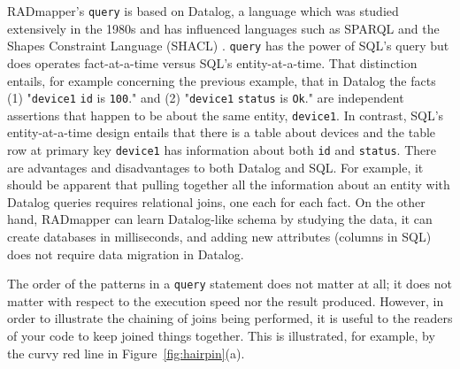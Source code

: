 \documentclass[9pt,letterpaper]{article}
\newcommand{\stt}[1]{\texttt{#1}} %
\begin{document}
RADmapper's \stt{query} is based on Datalog, a language which was studied extensively in the 1980s \cite{Abiteboul1995a}
and has influenced languages such as SPARQL and the Shapes Constraint Language (SHACL) \cite{?}.
\stt{query} has the power of SQL's  query but does operates fact-at-a-time versus SQL's entity-at-a-time.
That distinction entails, for example concerning the previous example, that in Datalog the facts (1) "\stt{device1} \stt{id} is \stt{100}." and (2) "\stt{device1} \stt{status} is \stt{Ok}." are independent assertions that happen to be about the same entity, \stt{device1}.
In contrast, SQL's entity-at-a-time design entails that there is a table about devices and the table row at primary key \stt{device1} has information about both \stt{id} and \stt{status}.
There are advantages and disadvantages to both Datalog and SQL.\@
For example, it should be apparent that pulling together all the information about an entity with Datalog queries requires relational joins, one each for each fact.
On the other hand, RADmapper can learn Datalog-like schema by studying the data, it can create databases in milliseconds, and adding new attributes (columns in SQL) does not require data migration in Datalog.

The order of the patterns in a \stt{query} statement does not matter at all; it does not matter with respect to the execution speed nor the result produced.
However, in order to illustrate the chaining of joins being performed, it is useful to the readers of your code to keep joined things together.
This is illustrated, for example, by the curvy red line in Figure~\ref{fig:hairpin}(a).


\end{document}
